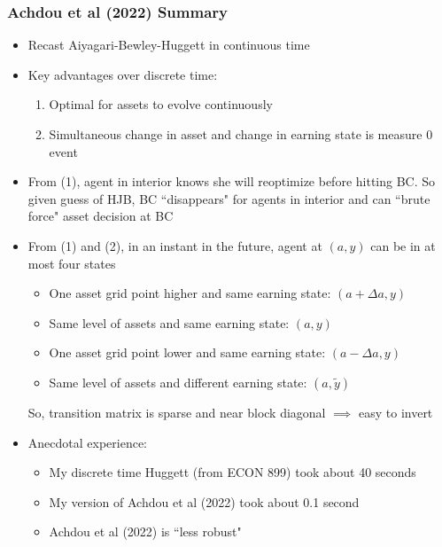 \documentclass[usenames,dvipsnames, handout, aspectratio=169]{beamer}
\begin{document}
\begin{frame}[label = achdou_summary]
\frametitle{Achdou et al (2022) Summary \hyperlink{achdou_details_1}{}}
\small
\begin{itemize}
\item Recast Aiyagari-Bewley-Huggett in continuous time 
\item Key advantages over discrete time: 
\begin{enumerate}
\item Optimal for assets to evolve continuously
\item Simultaneous change in asset and change in earning state is measure 0 event
\end{enumerate}
\item From (1), agent in interior knows she will reoptimize before hitting BC. So given guess of HJB, BC ``disappears" for agents in interior and can ``brute force" asset decision at BC
\item From (1) and (2), in an instant in the future,  agent at $(a, y)$ can be in at most four states
\begin{itemize}
\item One asset grid point higher and same earning state: $(a + \Delta a , y)$
\item Same level of assets and same earning state: $(a, y)$
\item One asset grid point lower and same earning state: $(a - \Delta a, y)$
\item Same level of assets and different earning state: $(a, \tilde y)$
\end{itemize}
So, transition matrix is sparse and near block diagonal $\implies$ easy to invert 
\item Anecdotal experience: 
\begin{itemize}
\item My discrete time Huggett (from ECON 899) took about 40 seconds
\item My version of Achdou et al (2022) took about 0.1 second
\item Achdou et al (2022) is ``less robust"
\end{itemize}
\end{itemize}
\end{frame}
\end{document}
